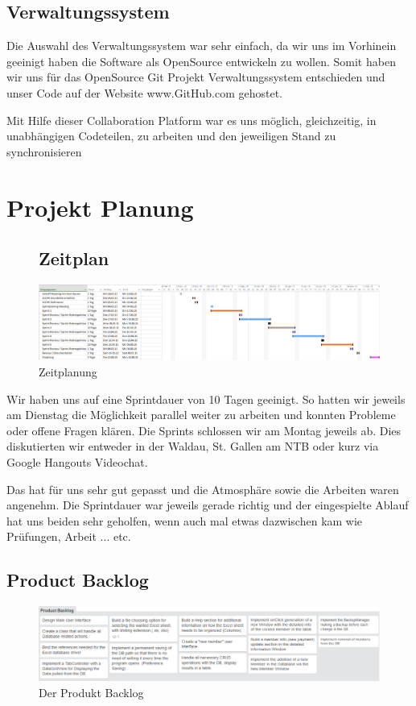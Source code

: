 \documentclass{article}
\begin{document}
\subsection{Verwaltungssystem}
Die Auswahl des Verwaltungssystem war sehr einfach, da wir uns im Vorhinein geeinigt haben die Software als OpenSource entwickeln zu wollen. Somit haben wir uns für das OpenSource Git Projekt Verwaltungssystem entschieden und unser Code auf der Website www.GitHub.com gehostet.

Mit Hilfe dieser Collaboration Platform war es uns möglich, gleichzeitig, in unabhängigen Codeteilen, zu arbeiten und den jeweiligen Stand zu synchronisieren

\newpage

\section{Projekt Planung}
	\begin{figure}[h]
		\subsection{Zeitplan}
		\bigskip
		\begin{center}
			\centering
			\includegraphics[width=0.8\paperwidth]{PJPlanung}
			\caption{Zeitplanung}
		\end{center}
	\end{figure}	
	
Wir haben uns auf eine Sprintdauer von 10 Tagen geeinigt. So hatten wir jeweils am Dienstag die Möglichkeit parallel weiter zu arbeiten und konnten Probleme oder offene Fragen klären. Die Sprints schlossen wir am Montag jeweils ab. Dies diskutierten wir entweder in der Waldau, St. Gallen am NTB oder kurz via Google Hangouts Videochat.

Das hat für uns sehr gut gepasst und die Atmosphäre sowie die Arbeiten waren angenehm. Die Sprintdauer war jeweils gerade richtig und der eingespielte Ablauf hat uns beiden sehr geholfen, wenn auch mal etwas dazwischen kam wie Prüfungen, Arbeit ... etc.
	
\subsection{Product Backlog}
\begin{figure}[h]
		\begin{center}
			\centering
			\includegraphics[width=0.8\paperwidth]{ProductBacklog1}
			\caption{Der Produkt Backlog}
		\end{center}
	\end{figure}
	
\end{document}
